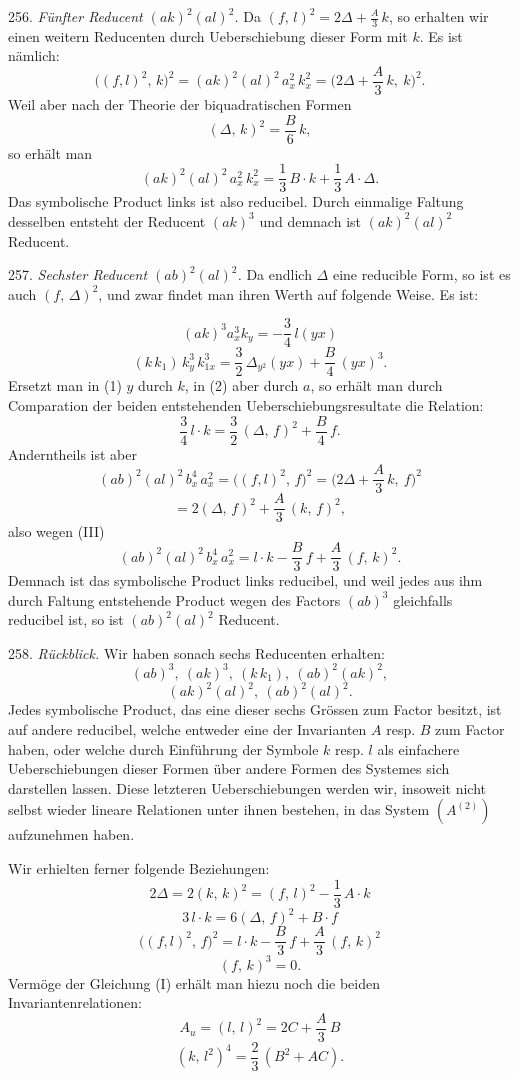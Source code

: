 \documentclass[11pt]{article}
\providecommand{\weberpage}[1]{}
\providecommand{\weq}[2]{\begin{equation}\tag{#1}#2\end{equation}}
\begin{document}
256. \textit{Fünfter Reducent $(ak)^2(al)^2$.} Da $(f,\,l)^2 = 2\varDelta
+ \frac{A}{3}\,k$, so erhalten wir einen weitern Reducenten durch
Ueberschiebung dieser Form mit $k$. Es ist nämlich:
\[
\big((f,l)^2,\,k\big)^2 = (ak)^2(al)^2\,a_x^2\,k_x^2 =
\Big(2\varDelta + \frac{A}{3}\,k,\ k\Big)^2.
\]
Weil aber nach der Theorie der biquadratischen Formen
\[
(\varDelta,\,k)^2 = \frac{B}{6}\,k,
\]
so erhält man
\[
(ak)^2(al)^2\,a_x^2\,k_x^2 = \frac{1}{3}\,B\cdot k + \frac{1}{3}\,A\cdot\varDelta.
\]
Das symbolische Product links ist also reducibel. Durch einmalige
Faltung desselben entsteht der Reducent $(ak)^3$ und demnach ist
$(ak)^2(al)^2$ Reducent.

257. \textit{Sechster Reducent $(ab)^2(al)^2$.} Da endlich $\varDelta$
eine reducible Form, so ist es auch $(f,\,\varDelta)^2$, und zwar findet
man ihren Werth auf folgende Weise. Es ist:


\weberpage{279}
\weq{1}{(ak)^3 a_x^3 k_y = -\frac{3}{4}\,l(yx)}
\weq{2}{(k\,k_1)\,k_y^3\,k_{1x}^3 = \frac{3}{2}\,\varDelta_{y^2}(yx) + \frac{B}{4}\,(yx)^3.}
Ersetzt man in (1) $y$ durch $k$, in (2) aber durch $a$, so erhält man
durch Comparation der beiden entstehenden Ueberschiebungsresultate die
Relation:
\weq{III}{\frac{3}{4}\,l\cdot k = \frac{3}{2}\,(\varDelta,\,f)^2 + \frac{B}{4}\,f.}
Anderntheils ist aber
\[
(ab)^2(al)^2\,b_x^4\,a_x^2 = \big((f,l)^2,\,f\big)^2 =
\Big(2\varDelta+\frac{A}{3}\,k,\ f\Big)^2
\]
\[
= 2(\varDelta,\,f)^2 + \frac{A}{3}\,(k,\,f)^2,
\]
also wegen (III)
\weq{IV}{(ab)^2(al)^2\,b_x^4\,a_x^2 = l\cdot k - \frac{B}{3}\,f + \frac{A}{3}\,(f,\,k)^2.}
Demnach ist das symbolische Product links reducibel, und weil jedes aus
ihm durch Faltung entstehende Product wegen des Factors $(ab)^3$
gleichfalls reducibel ist, so ist $(ab)^2(al)^2$ Reducent.

258. \textit{Rückblick.} Wir haben sonach sechs Reducenten erhalten:
\[
(ab)^3,\ (ak)^3,\ (k\,k_1),\ (ab)^2(ak)^2,
\]
\[
(ak)^2(al)^2,\ (ab)^2(al)^2.
\]
Jedes symbolische Product, das eine dieser sechs Grössen zum Factor
besitzt, ist auf andere reducibel, welche entweder eine der Invarianten
$A$ resp. $B$ zum Factor haben, oder welche durch Einführung der
Symbole $k$ resp. $l$ als einfachere Ueberschiebungen dieser Formen
über andere Formen des Systemes sich darstellen lassen. Diese
letzteren Ueberschiebungen werden wir, insoweit nicht selbst wieder
lineare Relationen unter ihnen bestehen, in das System $(A^{(2)})$
aufzunehmen haben.

Wir erhielten ferner folgende Beziehungen:
\weq{I}{2\varDelta = 2(k,\,k)^2 = (f,\,l)^2 - \frac{1}{3}\,A\cdot k}
\weq{II}{3\,l\cdot k = 6(\varDelta,\,f)^2 + B\cdot f}
\weq{III}{\big((f,l)^2,\,f\big)^2 = l\cdot k - \frac{B}{3}\,f + \frac{A}{3}\,(f,\,k)^2}
\[
(f,\,k)^3 = 0.
\]
Vermöge der Gleichung (I) erhält man hiezu noch die beiden
Invariantenrelationen:
\weq{IV}{A_u = (l,\,l)^2 = 2C + \frac{A}{3}\,B}
\weq{V}{(k,\,l^2)^4 = \frac{2}{3}\,(B^2+AC).}
\end{document}

